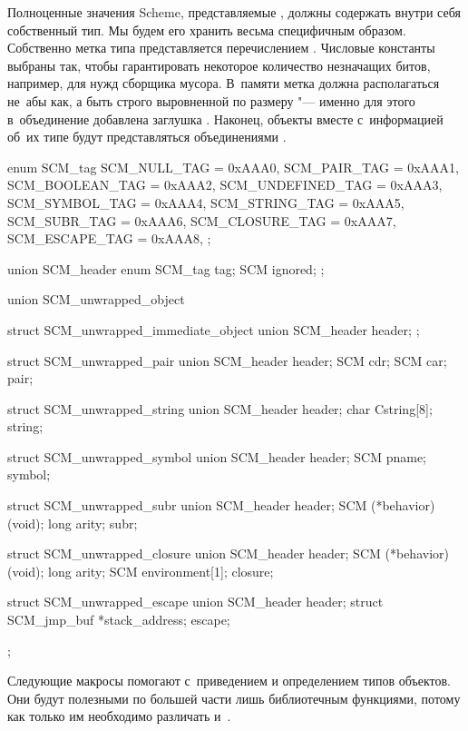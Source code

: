 Полноценные значения Scheme, представляемые , должны содержать
внутри себя собственный тип. Мы будем его хранить весьма специфичным образом.
Собственно метка типа представляется перечислением . Числовые
константы выбраны так, чтобы гарантировать некоторое количество незначащих
битов, например, для нужд сборщика мусора. В~памяти метка должна располагаться
не~абы как, а быть строго выровненной по размеру  "--- именно для этого
в~объединение  добавлена заглушка . Наконец, объекты
вместе с~информацией об~их типе будут представляться объединениями
.

\begin{code:c}
enum SCM_tag {
    SCM_NULL_TAG      = 0xAAA0,
    SCM_PAIR_TAG      = 0xAAA1,
    SCM_BOOLEAN_TAG   = 0xAAA2,
    SCM_UNDEFINED_TAG = 0xAAA3,
    SCM_SYMBOL_TAG    = 0xAAA4,
    SCM_STRING_TAG    = 0xAAA5,
    SCM_SUBR_TAG      = 0xAAA6,
    SCM_CLOSURE_TAG   = 0xAAA7,
    SCM_ESCAPE_TAG    = 0xAAA8,
};

union SCM_header {
    enum SCM_tag tag;
    SCM ignored;
};

union SCM_unwrapped_object {
    struct SCM_unwrapped_immediate_object {
        union SCM_header header;
    };

    struct SCM_unwrapped_pair {
        union SCM_header header;
        SCM cdr;
        SCM car;
    } pair;

    struct SCM_unwrapped_string {
        union SCM_header header;
        char Cstring[8];
    } string;

    struct SCM_unwrapped_symbol {
        union SCM_header header;
        SCM pname;
    } symbol;

    struct SCM_unwrapped_subr {
        union SCM_header header;
        SCM (*behavior)(void);
        long arity;
    } subr;

    struct SCM_unwrapped_closure {
        union SCM_header header;
        SCM (*behavior)(void);
        long arity;
        SCM environment[1];
    } closure;

    struct SCM_unwrapped_escape {
        union SCM_header header;
        struct SCM_jmp_buf *stack_address;
    } escape;
};
\end{code:c}

Следующие макросы помогают с~приведением и определением типов объектов. Они
будут полезными по большей части лишь библиотечным функциями, потому как только
им необходимо различать  и~.

